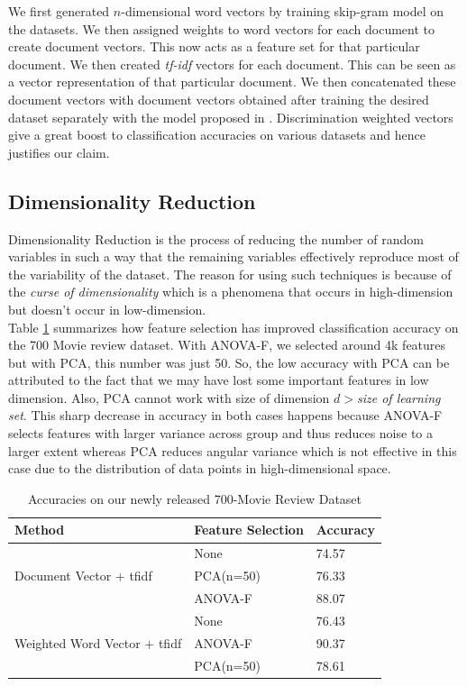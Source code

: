 \documentclass[11pt,a4paper]{article}
\begin{document}
We first generated $n$-dimensional word vectors by training skip-gram model on the datasets. We then assigned weights to word vectors for each document to create document vectors. This now acts as a feature set for that particular document. We then created \emph{tf-idf} vectors for each document. This can be seen as a vector representation of that particular document. We then concatenated these document vectors with document vectors obtained after training the desired dataset separately with the model proposed in \cite{Le:14}. Discrimination weighted vectors give a great boost to classification accuracies on various datasets and hence justifies our claim.

\subsection{Dimensionality Reduction}
\label{sec:dimensionality_reduction}
Dimensionality Reduction is the process of reducing the number of random variables in such a way that the remaining variables effectively reproduce most of the variability of the dataset.
The reason for using such techniques is because of the \emph{curse of dimensionality} which is a phenomena that occurs in high-dimension but doesn't occur in low-dimension.\\
Table \ref{table:700_movie_features} summarizes how feature selection has improved classification accuracy on the 700 Movie review dataset. With ANOVA-F, we selected around 4k features but with PCA, this number was just 50. So, the low accuracy with PCA can be attributed to the fact that we may have lost some important features in low dimension. Also, PCA cannot work with size of dimension $d>$\emph{size of learning set}. This sharp decrease in accuracy in both cases happens because ANOVA-F selects features with larger variance across group and thus reduces noise to a larger extent whereas PCA reduces angular variance which is not effective in this case due to the distribution of data points in high-dimensional space.
\begin{table}[H]
\small
\begin{tabular}{|p{3.6cm}|p{1.5cm}|p{1.4cm}|}
\hline
\textbf{Method} & \textbf{Feature Selection} & \textbf{Accuracy} \\ \hline
\multirow{3}{*}{Document Vector + tfidf}              & None      & 74.57 \\ \cline{2-3} 
                                              & PCA(n=50) & 76.33 \\ \cline{2-3} 
                                              & ANOVA-F & 88.07 \\ \hline
\multirow{3}{*}{Weighted Word Vector + tfidf} & None      & 76.43 \\ \cline{2-3} 
                                              & ANOVA-F   & 90.37 \\ \cline{2-3} 
                                              & PCA(n=50) & 78.61 \\ \hline
\end{tabular}
\caption {Accuracies on our newly released 700-Movie Review Dataset}
\label{table:700_movie_features}
\end{table}
\end{document}
